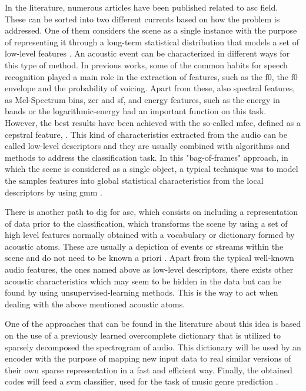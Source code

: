 	In the literature, numerous articles have been published related to \acrshort{asc} field. These can be sorted into two different currents based on how the problem is addressed. One of them considers the scene as a single instance with the purpose of representing it through a long-term statistical distribution that models a set of low-level features \cite{Stowell2015}. An acoustic event can be characterized in different ways for this type of method. In previous works, some of the common habits for speech recognition played a main role in the extraction of features, such as the \acrfull{f0}, the \acrshort{f0} envelope and the probability of voicing. Apart from these, also spectral features, as Mel-Spectrum bins, \acrfull{zcr} and \acrfull{sf}, and energy features, such as the energy in bands or the logarithmic-energy \cite{Geiger2013} had an important function on this task. However, the best results have been achieved with the so-called  \acrfull{mfcc}, defined as a cepstral feature, . This kind of characteristics extracted from the audio can be called low-level descriptors and they are usually combined with algorithms and methods to address the classification task. In this "bag-of-frames" approach, in which the scene is considered as a single object, a typical technique was to model the samples features into global statistical characteristics from the local descriptors by using \acrfull{gmm} \cite{Aucouturier2007}.
	
	There is another path to dig for \acrlong{asc}, which consists on including a representation of data prior to the classification, which transforms the scene by using a set of high level features normally obtained with a vocabulary or dictionary formed by acoustic atoms. These are usually a depiction of events or streams within the scene and do not need to be known a priori \cite{Stowell2015}. Apart from the typical well-known audio features, the ones named above as low-level descriptors, there exists other acoustic characteristics which may seem to be hidden in the data but can be found by using unsupervised-learning methods. This is the way to act when dealing with the above mentioned acoustic atoms. 
	
	One of the approaches that can be found in the literature about this idea is based on the use of a previously learned overcomplete dictionary that is utilized to sparsely decomposed the spectrogram of audio. This dictionary will be used by an encoder with the purpose of mapping new input data to real similar versions of their own sparse representation in a fast and efficient way. Finally, the obtained codes will feed a \acrfull{svm} classifier, used for the task of music genre prediction \cite{Henaff2011}. 
	
